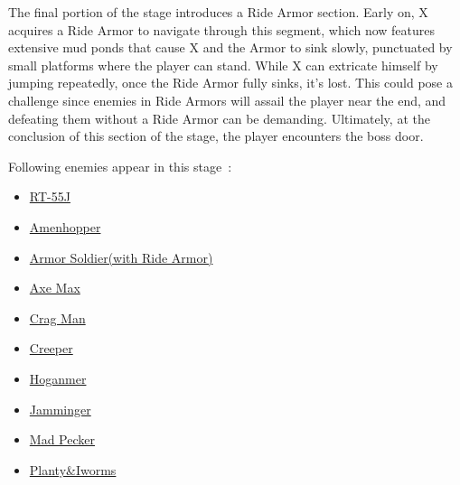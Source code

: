 The final portion of the stage introduces a Ride Armor section. Early on, X acquires a Ride Armor to navigate through this segment, which now features extensive mud ponds that cause X and the Armor to sink slowly, punctuated by small platforms where the player can stand. While X can extricate himself by jumping repeatedly, once the Ride Armor fully sinks, it's lost. This could pose a challenge since enemies in Ride Armors will assail the player near the end, and defeating them without a Ride Armor can be demanding. Ultimately, at the conclusion of this section of the stage, the player encounters the boss door.

Following enemies appear in this stage~\cite{wiki:Forest}:
\begin{itemize}
	\item \hyperlink {miniboss:RT-55J}{RT-55J}
	\item \hyperlink {enem:Amenhopper} {Amenhopper}
	\item \hyperlink {enem:Armor_Soldier} {Armor Soldier(with Ride Armor)}
	\item \hyperlink {enem:Axe_Max} {Axe Max}
	\item \hyperlink {enem:Crag_Man} {Crag Man}
	\item \hyperlink {enem:Creeper} {Creeper}
	\item \hyperlink {enem:Hoganmer} {Hoganmer}
	\item \hyperlink {enem:Jamminger} {Jamminger}
	\item \hyperlink {enem:Mad_Pecker} {Mad Pecker}
	\item \hyperlink {enem:Planty_Iworms} {Planty\&Iworms}
\end{itemize}

